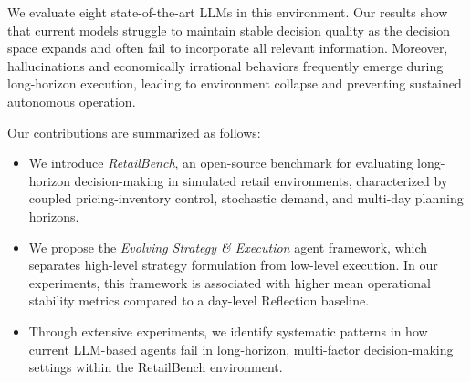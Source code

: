 We evaluate eight state-of-the-art LLMs in this environment. Our results show that current models struggle to maintain stable decision quality as the decision space expands and often fail to incorporate all relevant information. Moreover, hallucinations and economically irrational behaviors frequently emerge during long-horizon execution, leading to environment collapse and preventing sustained autonomous operation.

Our contributions are summarized as follows:
\begin{itemize}[leftmargin=*]
    \item We introduce \textit{RetailBench}, an open-source benchmark for evaluating long-horizon decision-making in simulated retail environments, characterized by coupled pricing-inventory control, stochastic demand, and multi-day planning horizons.
    \item We propose the \textit{Evolving Strategy \& Execution} agent framework, which separates high-level strategy formulation from low-level execution. In our experiments, this framework is associated with higher mean operational stability metrics compared to a day-level Reflection baseline.
    \item Through extensive experiments, we identify systematic patterns in how current LLM-based agents fail in long-horizon, multi-factor decision-making settings within the RetailBench environment.
\end{itemize}
